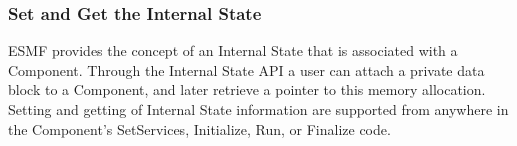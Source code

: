  
\setlength{\oldparskip}{\parskip}
\setlength{\parskip}{1.5ex}
\setlength{\oldparindent}{\parindent}
\setlength{\parindent}{0pt}
\setlength{\oldbaselineskip}{\baselineskip}
\setlength{\baselineskip}{11pt}
 
\def\bv{\begin{verbatim}}
\def\ev{\end{verbatim}}
\def\be{\begin{equation}}
\def\ee{\end{equation}}
\def\bea{\begin{eqnarray}}
\def\eea{\end{eqnarray}}
\def\bi{\begin{itemize}}
\def\ei{\end{itemize}}
\def\bn{\begin{enumerate}}
\def\en{\end{enumerate}}
\def\bd{\begin{description}}
\def\ed{\end{description}}
\def\({\left (}
\def\){\right )}
\def\[{\left [}
\def\]{\right ]}
\def\<{\left  \langle}
\def\>{\right \rangle}
\def\cI{{\cal I}}
\def\diag{\mathop{\rm diag}}
\def\tr{\mathop{\rm tr}}


 

  \subsubsection{Set and Get the Internal State}  
  
     ESMF provides the concept of an Internal State that is associated with
     a Component. Through the Internal State API a user can attach a private
     data block to a Component, and later retrieve a pointer to this memory
     allocation. Setting and getting of Internal State information are
     supported from anywhere in the Component's SetServices, Initialize, Run,
     or Finalize code.
  
